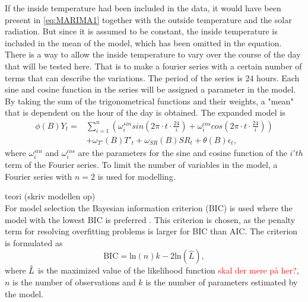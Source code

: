 \noindent If the inside temperature had been included in the data, it would have been present in \cref{eq:MARIMA1} together with the outside temperature and the solar radiation. But since it is assumed to be constant, the inside temperature is included in the mean of the model, which has been omitted in the equation. There is a way to allow the inside temperature to vary over the course of the day that will be tested here. That is to make a fourier series with a certain number of terms that can describe the variations. The period of the series is 24 hours. Each sine and cosine function in the series will be assigned a parameter in the model. By taking the sum of the trigonometrical functions and their weights, a "mean" that is dependent on the hour of the day is obtained. The expanded model is
\begin{align}
    \phi (B) Y_t = &\sum_{i=1}^n \left(\omega^{sin}_i sin\left(2\pi\cdot t \cdot \frac{24}{i}\right) + \omega^{cos}_i cos\left(2\pi\cdot t \cdot \frac{24}{i}\right)\right) \nonumber\\ & + \omega_{T'}(B)T'_t + \omega_{SR}(B)SR_t + \theta (B) \epsilon_t ,
    \label{eq:MARIMA2}
\end{align}
where $\omega^{sin}_i$ and $\omega^{cos}_i$ are the parameters for the sine and cosine function of the $i'th$ term of the Fourier series. To limit the number of variables in the model, a Fourier series with $n=2$ is used for modelling.

teori (skriv modellen op) \\

\noindent For model selection the Bayesian information criterion (BIC) is used where the model with the lowest BIC is preferred \cite{BIC}. This criterion is chosen, as the penalty term for resolving overfitting problems is larger for BIC than AIC. The criterion is formulated as
\begin{equation}
    \text{BIC} = \text{ln}(n)k - 2\text{ln}(\widehat{L}),
\end{equation}
where $\Hat{L}$ is the maximized value of the likelihood function \textcolor{red}{skal der mere på her?}, $n$ is the number of observations and $k$ is the number of parameters estimated by the model. \\

